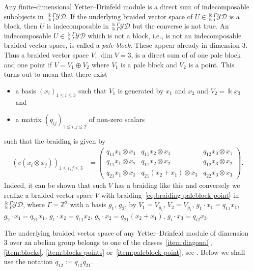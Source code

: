 \documentclass[pdftex]{sigma}
\numberwithin{equation}{section}
\newcommand{\Z}{{\mathbb Z}}
\newcommand{\yd}[1]{{}_{#1}^{#1}\mathcal{YD}}
\begin{document}
Any finite-dimensional Yetter--Drinfeld module is a direct sum of indecomposable subobjects in~$\yd{\Bbbk\Gamma}$.
If the underlying braided vector space of $U\in\yd{\Bbbk\Gamma}$ is a block, then $U$ is indecomposable in $\yd{\Bbbk\Gamma}$ but the converse is not true. An indecomposable $U\in\yd{\Bbbk\Gamma}$ which is not a block, i.e., is not an indecomposable braided vector space, is called a \emph{pale block}. These appear already in dimension 3.
Thus a braided vector space $V$, $\dim V = 3$, is a direct sum of of one pale block and one point if
$V = V_1 \oplus V_2$ where $V_1$ is a pale block and $V_2 $ is a point. This turns out to mean that there exist
\begin{itemize}%
\itemsep=0pt
\item a basis $(x_i)_{1\le i \le 3}$ such that $V_1$ is generated by $x_1$ and $x_2$ and $V_2 = \Bbbk x_3$ and
\item a matrix $(q_{ij})_{1 \le i,j \le 2}$ of non-zero scalars
\end{itemize}
such that the braiding is given by
\begin{align}\label{eq:braiding-paleblock-point}
(c(x_i \otimes x_j))_{1 \le i,j \le 3} &=
\begin{pmatrix}
q_{11} x_1 \otimes x_1& q_{11} x_2 \otimes x_1& q_{12} x_3 \otimes x_1
\\
q_{11} x_1 \otimes x_2 & q_{11} x_2 \otimes x_2& q_{12} x_3 \otimes x_2
\\
q_{21} x_1 \otimes x_3 & q_{21}(x_2 + x_1) \otimes x_3& q_{22} x_3 \otimes x_3
\end{pmatrix}\!.
\end{align}
Indeed, it can be shown that such $V$ has a braiding like this \cite[Sections~4.1 and~8.1]{AAH-triang} and conversely
we realize a braided vector space $V$ with braiding~\eqref{eq:braiding-paleblock-point}
in $\yd{\Bbbk\Gamma}$, where $\Gamma = \Z^2$ with a basis $g_1$, $g_2$,
by $V_1 = V_{g_1}$, $V_2 = V_{g_2}$, $g_1\cdot x_1 = q_{11} x_1$, $g_2\cdot x_1 = q_{21} x_1$,
$g_1\cdot x_2 = q_{11} x_2$, $g_2\cdot x_2 = q_{21} (x_2 + x_1)$, $g_i\cdot x_3 = q_{i2} x_3$.

The underlying braided vector space of any Yetter--Drinfeld module of dimension 3 over an abelian group
belongs to one of the classes~\ref{item:diagonal}, \ref{item:blocks}, \ref{item:blocks-points} or~\ref{item:paleblock-point},
see \cite[Sections~4.1 and 8.1]{AAH-triang}. Below we shall use the notation $\widetilde{q}_{12} := q_{12}q_{21}$.
\end{document}

